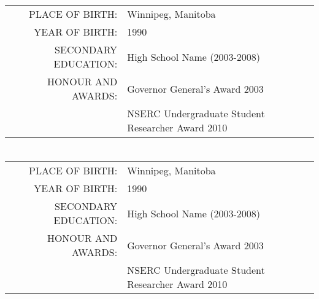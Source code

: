 \section*{\centering \StudentNameC}
\begin{table}[htdp]
\begin{center}
\begin{tabular}{rl}
	PLACE OF BIRTH: 
		& Winnipeg, Manitoba\\
	YEAR OF BIRTH: 
		& 1990 \\
	SECONDARY EDUCATION: 
		& High School Name (2003-2008) \\
	HONOUR AND AWARDS: 
		& Governor General's Award 2003 \\
		& NSERC Undergraduate Student Researcher Award 2010 \\
\end{tabular}
\end{center}
\end{table}

\section*{\centering \StudentNameD}
\begin{table}[htdp]
\begin{center}
\begin{tabular}{rl}
	PLACE OF BIRTH: 
		& Winnipeg, Manitoba\\ 
	YEAR OF BIRTH: 
		& 1990 \\ 
	SECONDARY EDUCATION: 
		& High School Name (2003-2008) \\
	HONOUR AND AWARDS: 
		& Governor General's Award 2003 \\
		& NSERC Undergraduate Student Researcher Award 2010 \\
\end{tabular}
\end{center}
\end{table}
\newpage

